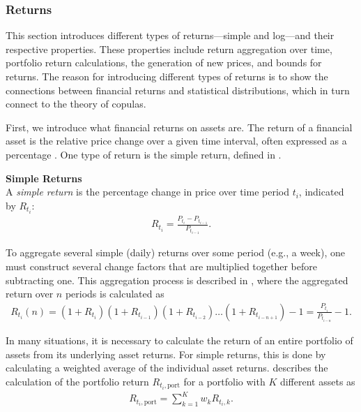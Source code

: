 \subsubsection{Returns}
This section introduces different types of returns—simple and log—and their respective properties. These properties include return aggregation over time, portfolio return calculations, the generation of new prices, and bounds for returns. The reason for introducing different types of returns is to show the connections between financial returns and statistical distributions, which in turn connect to the theory of copulas. 

First, we introduce what financial returns on assets are. The return of a financial asset is the relative price change over a given time interval, often expressed as a percentage \citet[p.~2]{Danielsson2011}. One type of return is the simple return, defined in .

\begin{definition}\label{def:simpleReturns}
    \textbf{Simple Returns} \citet[p.~3]{Danielsson2011} \\
    A \emph{simple return} is the percentage change in price over time period $t_i$, indicated by $R_{t_i}$:
    \begin{align*}
        R_{t_i} = \frac{P_{t_i}-P_{t_{i-1}}}{P_{t_{i-1}}}.
    \end{align*}
\end{definition}

To aggregate several simple (daily) returns over some period (e.g., a week), one must construct several change factors that are multiplied together before subtracting one. This aggregation process is described in \citet[p.~3]{Danielsson2011}, where the aggregated return over $n$ periods is calculated as
\begin{align*}
    R_{t_{i}}(n) = (1+R_{t_{i}})(1+R_{t_{i-1}})(1+R_{t_{i-2}})\dots (1+R_{t_{i-n+1}}) -1 = \frac{P_{t_{i}}}{P_{t_{i-n}}}-1.
\end{align*}

In many situations, it is necessary to calculate the return of an entire portfolio of assets from its underlying asset returns. For simple returns, this is done by calculating a weighted average of the individual asset returns. \citet[p.~3]{Danielsson2011} describes the calculation of the portfolio return $R_{t_i,\mathrm{port}}$ for a portfolio with $K$ different assets as 
\begin{align*}
    R_{t_i,\mathrm{port}} = \sum_{k=1}^K w_k R_{t_i,k}.
\end{align*}

